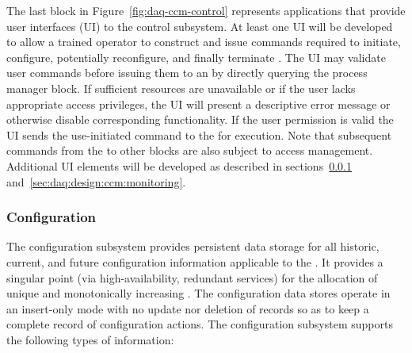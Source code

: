 The last block in Figure~\ref{fig:daq-ccm-control} represents applications that provide user interfaces (UI) to the control subsystem.
At least one UI will be developed to allow a trained operator to construct and issue commands required to initiate, configure, potentially reconfigure, and finally terminate . 
The UI may validate user commands before issuing them to an  by directly querying the process manager block. 
If sufficient resources are unavailable or if the user lacks appropriate access privileges, the UI will present a descriptive error message or otherwise disable corresponding functionality.  
If the user permission is valid the UI sends the use-initiated command to the  for execution.
Note that subsequent commands from the  to other blocks are also subject to access management.
Additional UI elements will be developed as described in sections~\ref{sec:daq:design:ccm:configuration} and~\ref{sec:daq:design:ccm:monitoring}.


\subsubsection{Configuration}
\label{sec:daq:design:ccm:configuration}

The  configuration subsystem provides persistent data storage for all historic, current, and future configuration information applicable to the .
It provides a singular point (via high-availability, redundant services) for the allocation of unique and monotonically increasing .
The configuration data stores operate in an insert-only mode with no update nor deletion of records so as to keep a complete record of configuration actions.
The configuration subsystem supports the following types of information:

